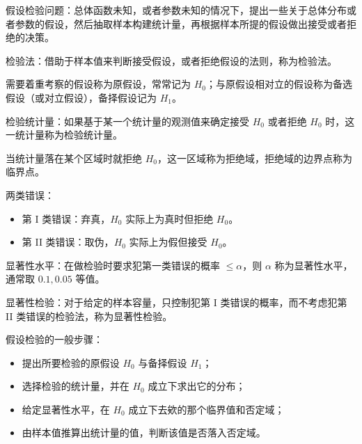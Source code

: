假设检验问题：总体函数未知，或者参数未知的情况下，提出一些关于总体分布或者参数的假设，然后抽取样本构建统计量，再根据样本所提的假设做出接受或者拒绝的决策。

检验法：借助于样本值来判断接受假设，或者拒绝假设的法则，称为检验法。

需要着重考察的假设称为原假设，常常记为 $H_0$；与原假设相对立的假设称为备选假设（或对立假设），备择假设记为 $H_1$。

检验统计量：如果基于某一个统计量的观测值来确定接受 $H_0$ 或者拒绝 $H_0$ 时，这一统计量称为检验统计量。

当统计量落在某个区域时就拒绝 $H_0$，这一区域称为拒绝域，拒绝域的边界点称为临界点。

两类错误：
\begin{itemize}
	\item 第 I 类错误：弃真，$H_0$ 实际上为真时但拒绝 $H_0$。
	\item 第 II 类错误：取伪，$H_0$ 实际上为假但接受 $H_0$。
\end{itemize}

显著性水平：在做检验时要求犯第一类错误的概率 $\leqslant \alpha$，则 $\alpha$ 称为显著性水平，通常取 $0.1, 0.05$ 等值。

显著性检验：对于给定的样本容量，只控制犯第 I 类错误的概率，而不考虑犯第 II 类错误的检验法，称为显著性检验。

假设检验的一般步骤：
\begin{itemize}
	\item 提出所要检验的原假设 $H_0$ 与备择假设 $H_1$；
	\item 选择检验的统计量，并在 $H_0$ 成立下求出它的分布；
	\item 给定显著性水平，在 $H_0$ 成立下去欸的那个临界值和否定域；
	\item 由样本值推算出统计量的值，判断该值是否落入否定域。
\end{itemize}
